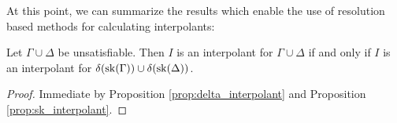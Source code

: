 At this point, we can summarize the results which enable the use of resolution based methods for calculating interpolants: 

\begin{thm}
	Let $\Gamma \cup \Delta$ be unsatisfiable.
	Then $I$ is an interpolant for \mbox{$\Gamma \cup \Delta$} if and only if 
	$I$ is an interpolant for $\delta(\operatorname{sk}(\Gamma)) \cup \delta(\operatorname{sk}(\Delta))$.
\end{thm}
\begin{proof}
	Immediate by Proposition \ref{prop:delta_interpolant} and Proposition \ref{prop:sk_interpolant}.
\end{proof}

